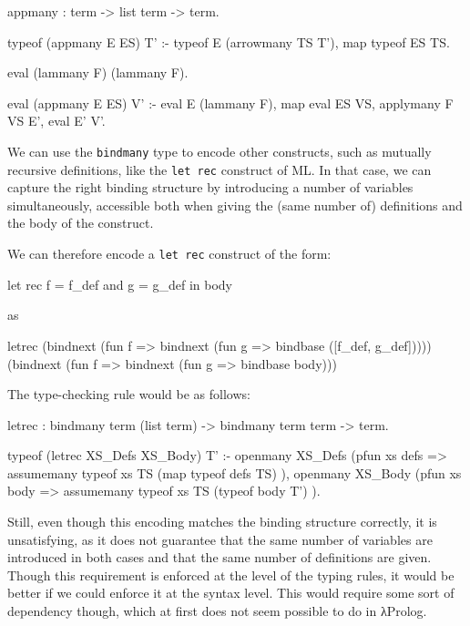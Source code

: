 \documentclass[format=acmlarge,review,anonymous]{acmart}\settopmatter{printfolios=true}
\begin{document}
\begin{codequote}
appmany : term -> list term -> term.

typeof (appmany E ES) T' :-
  typeof E (arrowmany TS T'),
  map typeof ES TS.

eval (lammany F) (lammany F).

eval (appmany E ES) V' :-
  eval E (lammany F),
  map eval ES VS,
  applymany F VS E',
  eval E' V'.
\end{codequote}

We can use the \texttt{bindmany} type to encode other constructs, such
as mutually recursive definitions, like the \texttt{let rec} construct
of ML. In that case, we can capture the right binding structure by
introducing a number of variables simultaneously, accessible both when
giving the (same number of) definitions and the body of the construct.

We can therefore encode a \texttt{let rec} construct of the form:

\begin{codequote}
let rec f = f_def and g = g_def in body
\end{codequote}

as

\begin{codequote}
letrec (bindnext (fun f => bindnext (fun g => bindbase ([f_def, g_def]))))
       (bindnext (fun f => bindnext (fun g => bindbase body)))
\end{codequote}

The type-checking rule would be as follows:

\begin{codequote}
letrec : bindmany term (list term) -> bindmany term term -> term.

typeof (letrec XS_Defs XS_Body) T' :-
  openmany XS_Defs (pfun xs defs =>
    assumemany typeof xs TS (map typeof defs TS)
  ),
  openmany XS_Body (pfun xs body =>
    assumemany typeof xs TS (typeof body T')
  ).
\end{codequote}

Still, even though this encoding matches the binding structure correctly, it is unsatisfying, as it
does not guarantee that the same number of variables are introduced in both cases and that the same
number of definitions are given. Though this requirement is enforced at the level of the typing
rules, it would be better if we could enforce it at the syntax level. This would require some sort
of dependency though, which at first does not seem possible to do in λProlog.
\end{document}
